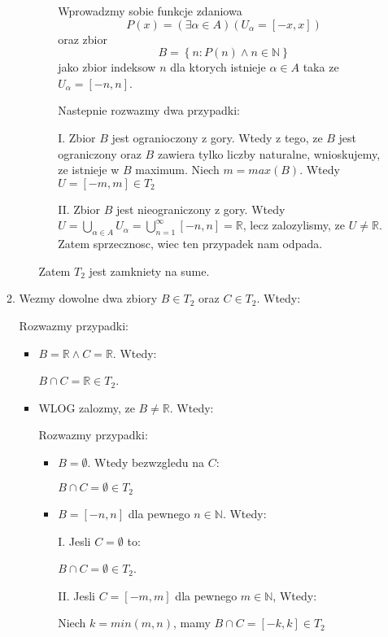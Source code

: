 \documentclass{article}
\begin{document}
\begin{enumerate}
\begin{enumerate}[label=(\alph*')]
\begin{itemize}
\begin{itemize}
Wprowadzmy sobie funkcje zdaniowa $$P(x) = (\exists \alpha \in A)(U_{\alpha} = [-x,x])$$ oraz zbior $$B = \left\{n : P(n) \land n \in \mathbb{N}\right\}$$ jako zbior indeksow $n$ dla ktorych istnieje $\alpha \in A$ taka ze $U_{\alpha} = [-n,n]$.

Nastepnie rozwazmy dwa przypadki:

I. Zbior $B$ jest ogranioczony z gory.
Wtedy z tego, ze $B$ jest ograniczony oraz $B$ zawiera tylko liczby naturalne, wnioskujemy, ze istnieje w $B$ maximum. Niech $m = max(B)$. Wtedy $U = [-m,m] \in T_{2}$ 
\vspace{5mm}

II. Zbior $B$ jest nieograniczony z gory.
Wtedy $U = \bigcup\limits_{\alpha \in A}U_{\alpha} = \bigcup\limits_{n=1}^{\infty}[-n,n] = \mathbb{R}$, lecz zalozylismy, ze $U \neq \mathbb{R}$. Zatem sprzecznosc, wiec ten przypadek nam odpada.

\end{itemize}%
Zatem $T_{2}$ jest zamkniety na sume.

\end{itemize}%
\item Wezmy dowolne dwa zbiory $B \in T_{2}$ oraz $C \in T_{2}$. Wtedy:

Rozwazmy przypadki:

\begin{itemize}%

\item $B = \mathbb{R} \land C = \mathbb{R}$. Wtedy:

$B \cap C = \mathbb{R} \in T_{2}$.
\item WLOG zalozmy, ze $B \neq \mathbb{R}$. Wtedy:

Rozwazmy przypadki:
\begin{itemize}%
    
\item $B = \emptyset$. Wtedy bezwzgledu na $C$:

$B \cap C = \emptyset \in T_{2}$
\item $B = [-n,n]$ dla pewnego $n \in \mathbb{N}$. Wtedy:

I. Jesli $C = \emptyset$ to:

$B\cap C = \emptyset \in T_{2}$.
\vspace{5mm}

II. Jesli $C = [-m,m]$ dla pewnego $m \in \mathbb{N}$, Wtedy:

Niech $k = min(m, n)$, mamy $B\cap C = [-k,k] \in T_{2}$
\end{itemize}%
\vspace{5mm}


\end{itemize}
\end{enumerate}
\end{enumerate}
\end{document}
